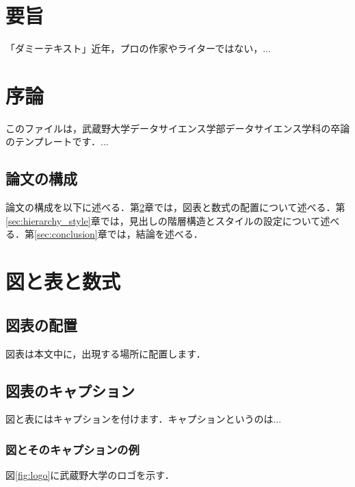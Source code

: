\documentclass[titlepage,12pt]{ltjsarticle}
\title{卒業論文 \vskip\baselineskip タイトルタイトルタイトル}
\author{武蔵野太郎\\ データサイエンス学科\\ 武蔵野大学}
\date{2025年1月}
\begin{document}
\maketitle

\section*{要旨}
「ダミーテキスト」近年，プロの作家やライターではない，...

\clearpage
\tableofcontents

\section{序論}\label{sec:introduction}
このファイルは，武蔵野大学データサイエンス学部データサイエンス学科の卒論のテンプレートです．...

\subsection{論文の構成}\label{subsec:structure}
論文の構成を以下に述べる．第\ref{sec:figures_tables_equations}章では，図表と数式の配置について述べる．第\ref{sec:hierarchy_style}章では，見出しの階層構造とスタイルの設定について述べる．第\ref{sec:conclusion}章では，結論を述べる．

\section{図と表と数式}\label{sec:figures_tables_equations}
\subsection{図表の配置}\label{subsec:placement}
図表は本文中に，出現する場所に配置します．

\subsection{図表のキャプション}\label{subsec:caption}
図と表にはキャプションを付けます．キャプションというのは...

\subsubsection{図とそのキャプションの例}\label{subsubsec:figure}
図\ref{fig:logo}に武蔵野大学のロゴを示す．
\end{document}

